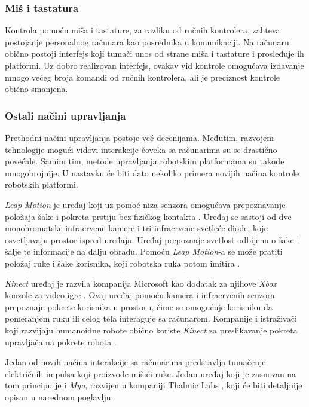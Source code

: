 \documentclass[12pt,a4paper]{report}
\begin{document}
\subsubsection{Miš i tastatura}

Kontrola pomoću miša i tastature, za razliku od ručnih kontrolera, zahteva postojanje personalnog računara kao posrednika u komunikaciji. Na računaru obično postoji interfejs koji tumači unos od strane miša i tastature i prosleđuje ih platformi. Uz dobro realizovan interfejs, ovakav vid kontrole omogućava izdavanje mnogo većeg broja komandi od ručnih kontrolera, ali je preciznost kontrole obično smanjena.

\subsubsection{Ostali načini upravljanja}
Prethodni načini upravljanja postoje već decenijama. Međutim, razvojem tehnologije mogući vidovi interakcije čoveka sa računarima su se drastično povećale. Samim tim, metode upravljanja robotskim platformama su takođe mnogobrojnije. U nastavku će biti dato nekoliko primera novijih načina kontrole robotskih platformi.

\textit{Leap Motion} je uređaj koji uz pomoć niza senzora omogućava prepoznavanje položaja šake i pokreta prstiju bez fizičkog kontakta \cite{leap}. Uređaj se sastoji od dve monohromatske infracrvene kamere i tri infracrvene svetleće diode, koje osvetljavaju prostor ispred uređaja. Uređaj prepoznaje svetlost odbijenu o šake i šalje te informacije na dalju obradu. Pomoću \textit{Leap Motion}-a se može pratiti položaj ruke i šake korisnika, koji robotska ruka potom imitira \cite{leap-article}.

\textit{Kinect} uređaj je razvila kompanija Microsoft kao dodatak za njihove \textit{Xbox} konzole za video igre \cite{kinect}. Ovaj uređaj pomoću kamera i infracrvenih senzora prepoznaje pokrete korisnika u prostoru, čime se omogućuje korisniku da pomeranjem ruku ili celog tela interaguje sa računarom. Kompanije i istraživači koji razvijaju humanoidne robote obično koriste \textit{Kinect} za preslikavanje pokreta upravljača na pokrete robota \cite{kinect-article}.

Jedan od novih načina interakcije sa računarima predstavlja tumačenje električnih impulsa koji proizvode mišići ruke. Jedan uređaj koji je zasnovan na tom principu je i \textit{Myo}, razvijen u kompaniji Thalmic Labs \cite{myo-specs}, koji će biti detaljnije opisan u narednom poglavlju. 
\end{document}
